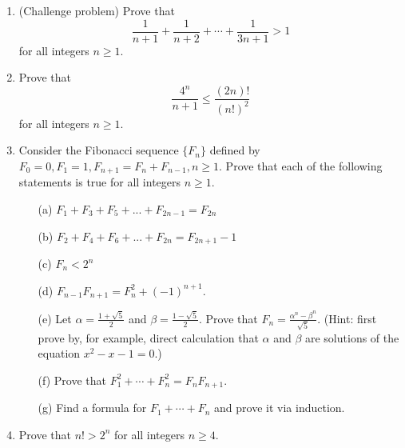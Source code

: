 \documentclass[12pt, reqno]{amsart}
\begin{document}
\begin{enumerate}


\item (Challenge problem) Prove that 
\[
\frac{1}{n + 1} + \frac{1}{n +2} + \cdots + \frac{1}{3n+1} > 1 
\]
for all integers $n \geq 1$.

\item Prove that 
\[
\frac{4^n}{n+1} \leq \frac{(2n)!}{(n!)^2}
\]
for all integers $n \geq 1$. 

\item Consider the Fibonacci sequence $\{F_n\}$ defined by $F_0 = 0, F_1 = 1, F_{n+1} = F_n + F_{n-1}, n \geq 1$. Prove that each of the following statements is true for all integers $n \geq 1$. 

 \begin{itemize}
 \item [(a)] $F_1 +F_3 +F_5 +...+F_{2n-1} =F_{2n}$
 \item [(b)] $F_2 +F_4 +F_6 +...+F_{2n} =F_{2n+1} -1$
 \item [(c)] $F_n< 2^n$
 \item [(d)] $F_{n-1} F_{n+1} = F^2_n + (-1)^{n+1}$.
 \item [(e)] Let $\alpha = \frac{1 + \sqrt{5}}{2}$ and $\beta = \frac{1 - \sqrt{5}}{2}$. Prove that $F_n = \frac{\alpha^n - \beta^n}{\sqrt{5}}$. (Hint: first prove by, for example, direct calculation that $\alpha$ and $\beta$ are solutions of the equation $x^2 - x - 1 = 0$.)
 \item [(f)] Prove that $F_1^2 + \cdots + F_n^2 = F_nF_{n+1}$.\vspace{0.3cm}
 \item [(g)] Find a formula for $F_1 + \cdots + F_n$ and prove it via induction.\vspace{0.3cm}

 \end{itemize}

\item Prove that $n! > 2^n$ for all integers $n \geq 4$.


\end{enumerate}
\end{document}
